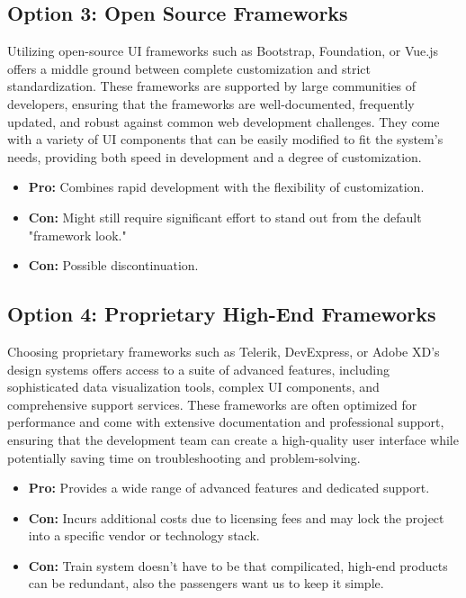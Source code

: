 \subsection*{Option 3: Open Source Frameworks}
Utilizing open-source UI frameworks such as Bootstrap, Foundation, or Vue.js offers a middle ground between complete customization and strict standardization. These frameworks are supported by large communities of developers, ensuring that the frameworks are well-documented, frequently updated, and robust against common web development challenges. They come with a variety of UI components that can be easily modified to fit the system’s needs, providing both speed in development and a degree of customization.
\begin{itemize}
    \item \textbf{Pro:} Combines rapid development with the flexibility of customization.
    \item \textbf{Con:} Might still require significant effort to stand out from the default "framework look."
    \item \textbf{Con:} Possible discontinuation.
\end{itemize}

\subsection*{Option 4: Proprietary High-End Frameworks}
Choosing proprietary frameworks such as Telerik, DevExpress, or Adobe XD’s design systems offers access to a suite of advanced features, including sophisticated data visualization tools, complex UI components, and comprehensive support services. These frameworks are often optimized for performance and come with extensive documentation and professional support, ensuring that the development team can create a high-quality user interface while potentially saving time on troubleshooting and problem-solving.
\begin{itemize}
    \item \textbf{Pro:} Provides a wide range of advanced features and dedicated support.
    \item \textbf{Con:} Incurs additional costs due to licensing fees and may lock the project into a specific vendor or technology stack.
    \item \textbf{Con:} Train system doesn't have to be that compilicated, high-end products can be redundant, also the passengers want us to keep it simple.
\end{itemize}

